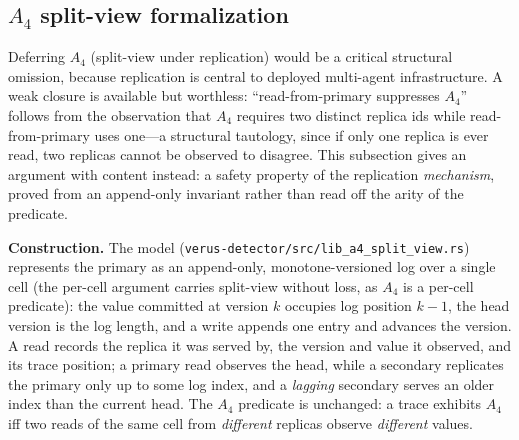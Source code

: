 \documentclass[journal,compsoc,10pt]{IEEEtran}
\theoremstyle{definition}
\theoremstyle{remark}
\begin{document}
\subsection{$A_4$ split-view formalization}
\label{sec:a4-formalisation}

Deferring $A_4$ (split-view under replication) would be a critical
structural omission, because replication is central to deployed
multi-agent infrastructure. A weak closure is available but worthless:
``read-from-primary suppresses $A_4$'' follows from the observation
that $A_4$ requires two distinct replica ids while read-from-primary uses
one---a structural tautology, since if only one replica is ever read, two
replicas cannot be observed to disagree. This subsection gives an
argument with content instead: a safety property of the replication
\emph{mechanism}, proved from an append-only invariant rather than read off
the arity of the predicate.

\medskip
\noindent\textbf{Construction.}
The model (\texttt{verus-detector/\allowbreak src/lib\_a4\_\allowbreak split\_view.rs}) represents the
primary as an append-only, monotone-versioned log over a single cell (the
per-cell argument carries split-view without loss, as $A_4$ is a per-cell
predicate): the value committed at version $k$ occupies log position $k-1$,
the head version is the log length, and a write appends one entry and
advances the version. A read records the replica it was served by, the
version and value it observed, and its trace position; a primary read
observes the head, while a secondary replicates the primary only up to some
log index, and a \emph{lagging} secondary serves an older index than the
current head. The $A_4$ predicate is unchanged: a trace exhibits $A_4$ iff two
reads of the same cell from \emph{different} replicas observe \emph{different}
values.
\end{document}
